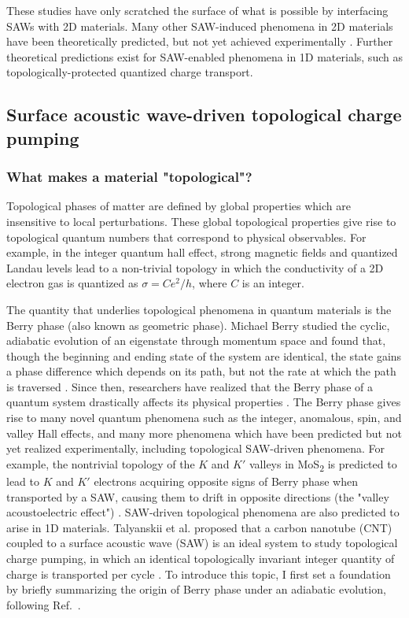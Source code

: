 \documentclass[double,12pt,1in,seploa]{beavtex}
\let\Oldsubsection\subsection
\renewcommand{\subsection}{\FloatBarrier\Oldsubsection}
\let\Oldsubsubsection\subsubsection
\renewcommand{\subsubsection}{\FloatBarrier\Oldsubsubsection}
\begin{document}
These studies have only scratched the surface of what is possible by interfacing SAWs with 2D materials. Many other SAW-induced phenomena in 2D materials have been theoretically predicted, but not yet achieved experimentally \cite{nie_surface_2023}. Further theoretical predictions exist for SAW-enabled phenomena in 1D materials, such as topologically-protected quantized charge transport.

\subsection{Surface acoustic wave-driven topological charge pumping}

\subsubsection{What makes a material "topological"?}

Topological phases of matter are defined by global properties which are insensitive to local perturbations. These global topological properties give rise to topological quantum numbers that correspond to physical observables. For example, in the integer quantum hall effect, strong magnetic fields and quantized Landau levels lead to a non-trivial topology in which the conductivity of a 2D electron gas is quantized as $\sigma = C e^2/h$, where $C$ is an integer. 

The quantity that underlies topological phenomena in quantum materials is the Berry phase (also known as geometric phase). Michael Berry studied the cyclic, adiabatic evolution of an eigenstate through momentum space and found that, though the beginning and ending state of the system are identical, the state gains a phase difference which depends on its path, but not the rate at which the path is traversed \cite{berry_quantal_1984}. Since then, researchers have realized that the Berry phase of a quantum system drastically affects its physical properties \cite{xiao_berry_2010}. The Berry phase gives rise to many novel quantum phenomena such as the integer, anomalous, spin, and valley Hall effects, and many more phenomena which have been predicted but not yet realized experimentally, including topological SAW-driven phenomena. For example, the nontrivial topology of the $K$ and $K'$ valleys in MoS\textsubscript{2} is predicted to lead to $K$ and $K'$ electrons acquiring opposite signs of Berry phase when transported by a SAW, causing them to drift in opposite directions (the "valley acoustoelectric effect") \cite{kalameitsev_valley_2019}. SAW-driven topological phenomena are also predicted to arise in 1D materials. Talyanskii et al. proposed that a carbon nanotube (CNT) coupled to a surface acoustic wave (SAW) is an ideal system to study topological charge pumping, in which an identical topologically invariant integer quantity of charge is transported per cycle \cite{talyanskii_quantized_2001}. To introduce this topic, I first set a foundation by briefly summarizing the origin of Berry phase under an adiabatic evolution, following Ref.\ \cite[Ch.\ 5]{sakurai_modern_1985}.
\end{document}
